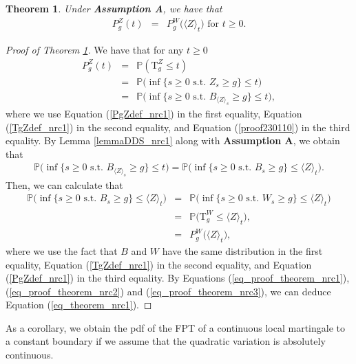 \documentclass[aop]{imsart}
\theoremstyle{plain}
\newtheorem{theorem}{Theorem}[section]
\theoremstyle{remark}
\newcommand{\proba}{\mathbb{P}}
\newcommand{\Tau}{\mathrm{T}}
\begin{document}
\begin{theorem}
\label{theorem_nrc1}
Under \textbf{Assumption A}, we have that
\begin{eqnarray}
\label{eq_theorem_nrc1}
P_g^Z (t) & = & P_g^W \big(\langle Z\rangle_{t}\big) \text{ for } t \geq 0.
\end{eqnarray}
\end{theorem}
\begin{proof}[Proof of Theorem \ref{theorem_nrc1}]
We have that for any $t \geq 0$
\begin{eqnarray}
\nonumber P_g^Z(t) & = & \proba (\Tau^Z_g \leq t)\\ \nonumber 
& = & \proba \big(\inf \{s \geq 0 \text{ s.t. } Z_s \geq g\} \leq t \big)\\ \label{eq_proof_theorem_nrc1} 
& = & \proba \big(\inf \{s \geq 0\text{ s.t. } B_{\langle Z\rangle_{s}} \geq g\} \leq t\big),
\end{eqnarray}
where we use Equation (\ref{PgZdef_nrc1}) in the first equality, Equation (\ref{TgZdef_nrc1}) in the second equality, and Equation (\ref{proof230110}) in the third equality. By Lemma \ref{lemmaDDS_nrc1} along with \textbf{Assumption A}, we obtain that
\begin{eqnarray}
\label{eq_proof_theorem_nrc2}\proba \Big(\inf \{s \geq 0 \text{ s.t. } B_{\langle Z\rangle_s}\geq g\} \leq t \Big)=\proba \Big(\inf \{s \geq 0 \text{ s.t. } B_s \geq g \} \leq \langle Z\rangle_t \Big).
\end{eqnarray}
Then, we can calculate that
\begin{eqnarray}
\nonumber \proba \Big(\inf \{s \geq 0 \text{ s.t. } B_s \geq g \} \leq \langle Z\rangle_t \Big)& = & \proba \Big(\inf \{s \geq 0 \text{ s.t. } W_s \geq g \} \leq \langle Z\rangle_t \Big)\\ \nonumber & = &\proba \Big(\Tau^W_g \leq \langle Z\rangle_t\Big),\\ \label{eq_proof_theorem_nrc3}
& = & P_g^W\big(\langle Z\rangle_t\big), 
\end{eqnarray}
where we use the fact that $B$ and $W$ have the same distribution in the first equality, Equation (\ref{TgZdef_nrc1}) in the second equality, and Equation (\ref{PgZdef_nrc1}) in the third equality. By Equations (\ref{eq_proof_theorem_nrc1}), (\ref{eq_proof_theorem_nrc2}) and (\ref{eq_proof_theorem_nrc3}), we can deduce Equation (\ref{eq_theorem_nrc1}).
\end{proof}
\noindent As a corollary, we obtain the pdf of the FPT of a continuous local martingale to a constant boundary if we assume that the quadratic variation is absolutely continuous.
\end{document}
